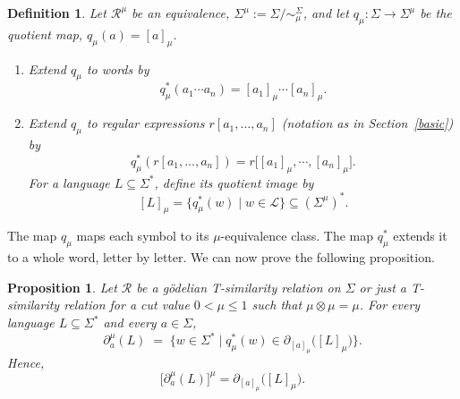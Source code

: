 \documentclass{article}
\newcommand{\cR}{{\mathcal R}}
\def\cut{\mu}
\newtheorem{definition}{Definition}[section]
\newtheorem{proposition}{Proposition}[section]
\begin{document}
\begin{definition}\label{def:quotient-language-fuzzy}
Let $\cR^\mu$ be an equivalence, $\Sigma^\cut := \Sigma/{\sim_\cut^\Sigma}$, and let
$q_\cut:\Sigma\to\Sigma^\cut$ be the quotient map, $q_\cut(a)=[a]_\cut$.\begin{enumerate}
\item Extend $q_\cut$ to words by
\[
  q_\cut^*(a_1\cdots a_n) = [a_1]_\cut \cdots [a_n]_\cut.
\]
\item Extend $q_\cut$ to regular expressions $r[a_1,\ldots,a_n]$ (notation as in Section~\ref{basic}) by
\[
  q_\cut^*(r[a_1,\ldots,a_n]) = r\bigl[[a_1]_\cut, \cdots, [a_n]_\cut\bigr].
\]
For a language $ L \subseteq \Sigma^*$, define its quotient image by
\[
  [L]_\cut %
  = \{q_\cut^*(w)\mid w\in\mathcal L\}
  \subseteq (\Sigma^\cut)^*.
\]
\end{enumerate}
\end{definition}

\noindent
The map $q_\cut$ maps each symbol to its $\cut$-equivalence class. The map
$q_\cut^*$ extends it to a whole word, letter by letter. We can now prove the following proposition.



\begin{proposition}\label{the:quotient-fuzzy-derivative}
Let $\cR$ be a g\"odelian T-similarity relation on $\Sigma$ or just a T-similarity relation for a cut value $0 < \cut \le 1$ such that $\mu\otimes\mu=\mu$. For every language $L \subseteq \Sigma^*$ and every
$a\in\Sigma$,
\[
  \partial_a^\cut( L)
  \;=\;
  \{w\in\Sigma^* \mid q_\cut^*(w)\in
       \partial_{[a]_\cut}\bigl( [L]_\cut \bigr)\}.
\]
Hence,
\[
  \bigl[\partial_a^\cut( L)\bigr]^\mu
  =
  \partial_{[a]_\cut}\bigl( [L]_\cut \bigr).
\]
\end{proposition}
\end{document}
